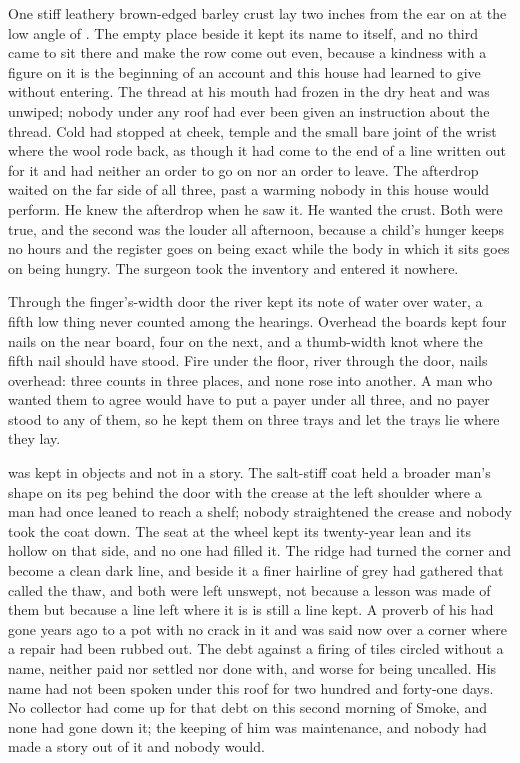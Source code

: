 One stiff leathery brown-edged barley crust lay two inches from the ear on  at the low angle of . The empty place beside it kept its name to itself, and no third came to sit there and make the row come out even, because a kindness with a figure on it is the beginning of an account and this house had learned to give without entering. The thread at his mouth had frozen in the dry heat and was unwiped; nobody under any roof had ever been given an instruction about the thread. Cold had stopped at cheek, temple and the small bare joint of the wrist where the wool rode back, as though it had come to the end of a line written out for it and had neither an order to go on nor an order to leave. The afterdrop waited on the far side of all three, past a warming nobody in this house would perform. He knew the afterdrop when he saw it. He wanted the crust. Both were true, and the second was the louder all afternoon, because a child's hunger keeps no hours and the register goes on being exact while the body in which it sits goes on being hungry. The surgeon took the inventory and entered it nowhere.

Through the finger's-width door the river kept its note of water over water, a fifth low thing never counted among the hearings. Overhead the boards kept four nails on the near board, four on the next, and a thumb-width knot where the fifth nail should have stood. Fire under the floor, river through the door, nails overhead: three counts in three places, and none rose into another. A man who wanted them to agree would have to put a payer under all three, and no payer stood to any of them, so he kept them on three trays and let the trays lie where they lay.

 was kept in objects and not in a story. The salt-stiff coat held a broader man's shape on its peg behind the door with the crease at the left shoulder where a man had once leaned to reach a shelf; nobody straightened the crease and nobody took the coat down. The seat at the wheel kept its twenty-year lean and its hollow on that side, and no one had filled it. The  ridge had turned the corner and become a clean dark line, and beside it a finer hairline of grey had gathered that  called the thaw, and both were left unswept, not because a lesson was made of them but because a line left where it is is still a line kept. A proverb of his had gone years ago to a pot with no crack in it and was said now over a corner where a repair had been rubbed out. The debt against a firing of tiles circled without a name, neither paid nor settled nor done with, and worse for being uncalled. His name had not been spoken under this roof for two hundred and forty-one days. No collector had come up  for that debt on this second morning of Smoke, and none had gone down it; the keeping of him was maintenance, and nobody had made a story out of it and nobody would.

